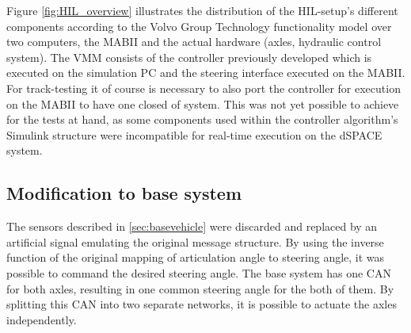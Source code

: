 \documentclass[root.tex]{subfiles}
\begin{document}
 Figure \ref{fig:HIL_overview} illustrates the distribution of the \gls{HIL}-setup's different components according to the Volvo Group Technology functionality model\cite{nilsson2015traffic} over two computers, the \gls{MABII} and the actual hardware (axles, hydraulic control system). The \gls{VMM} consists of the controller previously developed which is executed on the simulation PC and the steering interface executed on the \gls{MABII}. For track-testing it of course is necessary to also port the controller for execution on the \gls{MABII} to have one closed of system. This was not yet possible to achieve for the tests at hand, as some components used within the controller algorithm's  Simulink structure were incompatible for real-time execution on the dSPACE system.


\subsection{Modification to base system}
The sensors described in \ref{sec:basevehicle} were discarded and replaced by an artificial signal emulating the original message structure. By using the inverse  function of the original mapping of articulation angle to steering angle, it was possible to command the desired steering angle. The base system has one \gls{CAN} for both axles, resulting in one common steering angle for the both of them. By splitting this \gls{CAN} into two separate networks, it is possible to actuate the axles independently. 
\end{document}
